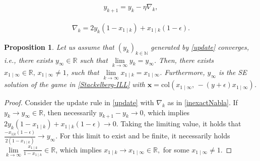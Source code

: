 \documentclass[10pt,a4paper]{amsart}
\newtheorem{proposition}{Proposition}
\newcommand{\real}{\mathbb{R}}
\newcommand\xbf{\mathbf{x}}
\begin{document}
\begin{align}\label{update}
    y_{k+1}=y_k-\eta \nabla_k,
\end{align}

\begin{align}\label{inexactNabla}
\nabla_k=2y_k(1-x_{1 \mid k})+x_{1 \mid k}(1-\epsilon).
\end{align}

\begin{proposition}\label{Cost/Osc}
    Let us assume that $\left(y_k\right)_{k \in \mathbb{N}}$ generated by \eqref{update} converges, i.e., there exists $y_{\infty} \in \real$ such that $\lim \limits_{k \rightarrow \infty} y_k = y_{\infty}$. Then, there exists $ x_{1 \mid \infty}\in \real, \, x_{1 \mid \infty} \neq 1$, such that $\lim \limits_{k \rightarrow \infty} x_{1 \mid k} = x_{1 \mid\infty}$. Furthermore, $y_\infty$ is the SE solution of the game in \eqref{Stackelberg-ILL} with $\xbf=\mathrm{col}(x_{1 \mid\infty}, \, -(y+\epsilon)x_{1 \mid \infty})$.
\end{proposition}

\begin{proof}
    Consider the update rule in \eqref{update} with $\nabla_k$ as in \eqref{inexactNabla}. If $y_k \rightarrow y_{\infty} \in \real$, then necessarily $y_{k+1}-y_k \rightarrow 0$, which implies $2 y_{k}(1-x_{1 \mid k})+x_{1 \mid k}(1-\epsilon) \rightarrow 0$. Taking the limiting value, it holds that $\frac{- x_{1|k}(1-\epsilon)}{2(1-x_{1 \mid k})} \rightarrow y_\infty$. For this limit to exist and be finite, it necessarily holds $\lim \limits_{k \rightarrow \infty}\frac{x_{1 \mid k}}{1-x_{1 \mid k}}\in \real$, which implies $x_{1 \mid k} \rightarrow x_{1 \mid \infty}\in \real,$ for some $ x_{1 \mid \infty} \neq 1$.
\end{proof}
\end{document}
